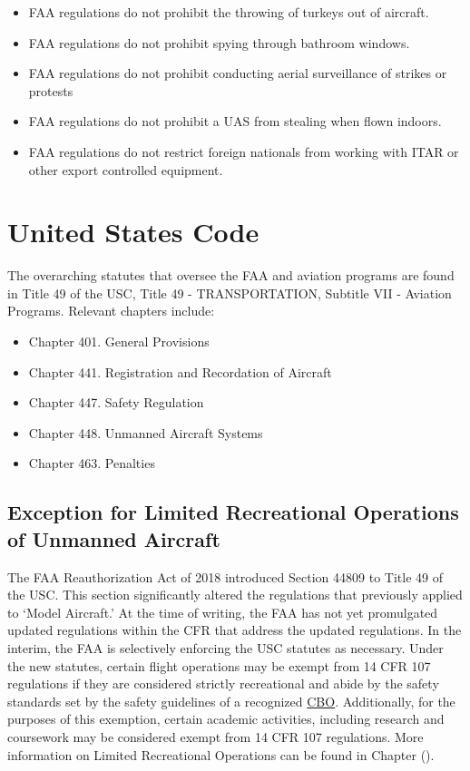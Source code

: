 \documentclass[
]{book}
\providecommand{\tightlist}{%
  \setlength{\itemsep}{0pt}\setlength{\parskip}{0pt}}
\begin{document}
\begin{itemize}
\tightlist
\item
  FAA regulations do not prohibit the throwing of turkeys out of aircraft.
\item
  FAA regulations do not prohibit spying through bathroom windows.
\item
  FAA regulations do not prohibit conducting aerial surveillance of strikes or protests
\item
  FAA regulations do not prohibit a UAS from stealing when flown indoors.
\item
  FAA regulations do not restrict foreign nationals from working with ITAR or other export controlled equipment.
\end{itemize}

\hypertarget{united-states-code}{%
\section{United States Code}\label{united-states-code}}

The overarching statutes that oversee the FAA and aviation programs are found in Title 49 of the USC, Title 49 - TRANSPORTATION, Subtitle VII - Aviation Programs. Relevant chapters include:

\begin{itemize}
\tightlist
\item
  Chapter 401. General Provisions
\item
  Chapter 441. Registration and Recordation of Aircraft
\item
  Chapter 447. Safety Regulation
\item
  Chapter 448. Unmanned Aircraft Systems
\item
  Chapter 463. Penalties
\end{itemize}

\hypertarget{ss-recreation}{%
\subsection{Exception for Limited Recreational Operations of Unmanned Aircraft}\label{ss-recreation}}

The FAA Reauthorization Act of 2018 introduced Section 44809 to Title 49 of the USC. This section significantly altered the regulations that previously applied to `Model Aircraft.' At the time of writing, the FAA has not yet promulgated updated regulations within the CFR that address the updated regulations. In the interim, the FAA is selectively enforcing the USC statutes as necessary. Under the new statutes, certain flight operations may be exempt from 14 CFR 107 regulations if they are considered strictly recreational and abide by the safety standards set by the safety guidelines of a recognized \protect\hyperlink{CBO}{CBO}. Additionally, for the purposes of this exemption, certain academic activities, including research and coursework may be considered exempt from 14 CFR 107 regulations. More information on Limited Recreational Operations can be found in Chapter ().
\end{document}
